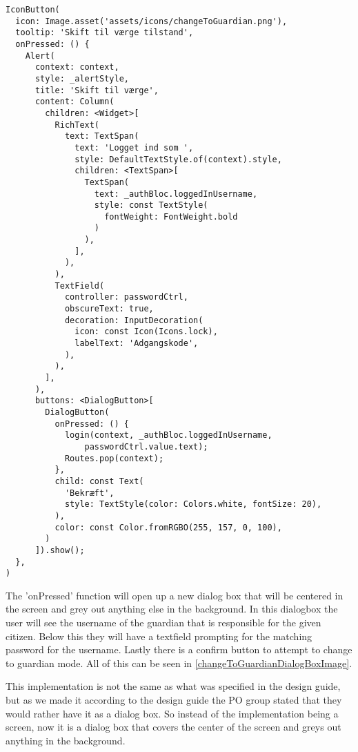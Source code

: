 \begin{lstlisting}
IconButton(
  icon: Image.asset('assets/icons/changeToGuardian.png'),
  tooltip: 'Skift til værge tilstand',
  onPressed: () {
    Alert(
      context: context,
      style: _alertStyle,
      title: 'Skift til værge',
      content: Column(
        children: <Widget>[
          RichText(
            text: TextSpan(
              text: 'Logget ind som ',
              style: DefaultTextStyle.of(context).style,
              children: <TextSpan>[
                TextSpan(
                  text: _authBloc.loggedInUsername,
                  style: const TextStyle(
                    fontWeight: FontWeight.bold
                  )
                ),
              ],
            ),
          ),
          TextField(
            controller: passwordCtrl,
            obscureText: true,
            decoration: InputDecoration(
              icon: const Icon(Icons.lock),
              labelText: 'Adgangskode',
            ),
          ),
        ],
      ),
      buttons: <DialogButton>[
        DialogButton(
          onPressed: () {
            login(context, _authBloc.loggedInUsername,
                passwordCtrl.value.text);
            Routes.pop(context);
          },
          child: const Text(
            'Bekræft',
            style: TextStyle(color: Colors.white, fontSize: 20),
          ),
          color: const Color.fromRGBO(255, 157, 0, 100),
        )
      ]).show();
  },
)
\end{lstlisting}

The 'onPressed' function will open up a new dialog box that will be centered in the screen and grey out anything else in the background. 
In this dialogbox the user will see the username of the guardian that is responsible for the given citizen. 
Below this they will have a textfield prompting for the matching password for the username. 
Lastly there is a confirm button to attempt to change to guardian mode.
All of this can be seen in \autoref{changeToGuardianDialogBoxImage}.


This implementation is not the same as what was specified in the design guide, but as we made it according to the design guide the PO group stated that they would rather have it as a dialog box. 
So instead of the implementation being a screen, now it is a dialog box that covers the center of the screen and greys out anything in the background.

